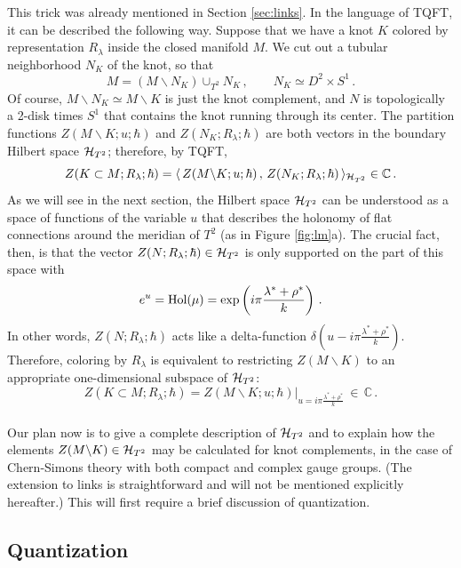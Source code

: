\documentclass[letterpaper,12pt]{article}
\numberwithin{equation}{section}
\newcommand{\be}{\begin{equation}}
\newcommand{\ee}{\end{equation}}
\newcommand{\bs}{\backslash}
\newcommand{\C}{{\mathbb{C}}}
\newcommand{\Hol}{{\rm Hol}}
\newcommand{\CH}{{\cal H}}
\renewcommand{\=}{\;=\;}
\begin{document}
This trick was already mentioned in Section \ref{sec:links}. In the language of TQFT, it can be described the following way. Suppose that we have a knot $K$ colored by representation $R_\lambda$ inside the closed manifold $M$.
We cut out a tubular neighborhood $N_K$ of the knot, so that
%
\be M = (M\bs N_K)\cup_{T^2}N_K\,,\qquad N_K\simeq D^2\times S^1\,.\ee
%
Of course, $M\bs N_K\simeq M\bs K$ is just the knot complement, and $N$ is topologically a 2-disk times $S^1$ that contains the knot running through its center. The partition functions $Z(M\bs K;u;\hbar)$ and $Z(N_K;R_\lambda;\hbar)$ are both vectors in the boundary Hilbert space $\CH_{T^2}$; therefore, by TQFT,
%
\be Z(K\subset M;R_\lambda;\hbar) = \langle\, Z(M\bs K;u;\hbar) \,,\, Z(N_K;R_\lambda;\hbar)\,\rangle_{\CH_{T^2}}\in\C\,.\ee
%
As we will see in the next section,
the Hilbert space $\CH_{T^2}$ can be understood as a space of functions
of the variable $u$ that describes the holonomy of flat connections around
the meridian of $T^2$ (as in Figure \ref{fig:lm}a).
The crucial fact, then, is that the vector $Z(N;R_\lambda;\hbar)\in \CH_{T^2}$
is only supported on the part of this space with
%
\be e^u = \Hol(\mu) = \exp\left(i\pi \frac{\lambda^*+\rho^*}{k} \right)\,. \label{holagain} \ee
%
In other words, $Z(N;R_\lambda;\hbar)$ acts like a delta-function $\delta(u-i\pi \frac{\lambda^*+\rho^*}{k})$. Therefore, coloring by $R_\lambda$ is equivalent to restricting $Z(M\bs K)$ to an appropriate one-dimensional subspace of $\CH_{T^2}$:
%
\be Z(K\subset M;R_\lambda;\hbar)
= Z(M\bs K;u;\hbar)\big|_{u=i\pi \frac{\lambda^*+\rho^*}{k}} \, \in\, \C \,. \label{uR} \ee \\
%
Our plan now is to give a complete description of $\CH_{T^2}$
and to explain how the elements $Z(M\bs K) \in \CH_{T^2}$ may be calculated for knot complements,
in the case of Chern-Simons theory with both compact and complex gauge groups.
(The extension to links is straightforward and will not be mentioned explicitly hereafter.)
This will first require a brief discussion of quantization.



\subsection{Quantization}
\label{sec:quant}
\end{document}
